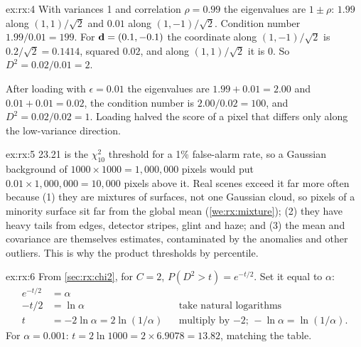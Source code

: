 \begin{solution}{ex:rx:4}
With variances 1 and correlation $\rho = 0.99$ the eigenvalues are $1 \pm \rho$: $1.99$ along
$(1, 1)/\sqrt2$ and $0.01$ along $(1, -1)/\sqrt2$. Condition number $1.99/0.01 = 199$.
For $\mathbf{d} = (0.1, -0.1)$ the coordinate along $(1, -1)/\sqrt2$ is $0.2/\sqrt2 = 0.1414$, squared
$0.02$, and along $(1, 1)/\sqrt2$ it is 0. So $D^2 = 0.02/0.01 = 2$.

After loading with $\epsilon = 0.01$ the eigenvalues are $1.99 + 0.01 = 2.00$ and
$0.01 + 0.01 = 0.02$, the condition number is $2.00/0.02 = 100$, and $D^2 = 0.02/0.02 = 1$. Loading
halved the score of a pixel that differs only along the low-variance direction.
\end{solution}

\begin{solution}{ex:rx:5}
23.21 is the $\chi^2_{10}$ threshold for a 1\% false-alarm rate, so a Gaussian background of
$1000\times1000 = 1{,}000{,}000$ pixels would put $0.01\times1{,}000{,}000 = 10{,}000$ pixels above it.
Real scenes exceed it far more often because (1) they are mixtures of surfaces, not one Gaussian
cloud, so pixels of a minority surface sit far from the global mean (\cref{we:rx:mixture}); (2) they
have heavy tails from edges, detector stripes, glint and haze; and (3) the mean and covariance are
themselves estimates, contaminated by the anomalies and other outliers. This is why the product
thresholds by percentile.
\end{solution}

\begin{solution}{ex:rx:6}
From \cref{sec:rx:chi2}, for $C = 2$, $P(D^2 > t) = e^{-t/2}$. Set it equal to $\alpha$:
\begin{align*}
e^{-t/2} &= \alpha\\
-t/2 &= \ln\alpha && \text{take natural logarithms}\\
t &= -2\ln\alpha = 2\ln(1/\alpha) && \text{multiply by $-2$; } -\ln\alpha = \ln(1/\alpha).
\end{align*}
For $\alpha = 0.001$: $t = 2\ln1000 = 2\times6.9078 = 13.82$, matching the table.
\end{solution}
